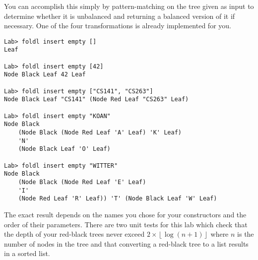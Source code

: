 
You can accomplish this simply by pattern-matching on the tree given as input to determine whether it is unbalanced and returning a balanced version of it if necessary. One of the four transformations is already implemented for you.

\taskLine


\begin{verbatim}
Lab> foldl insert empty []
Leaf

Lab> foldl insert empty [42]
Node Black Leaf 42 Leaf

Lab> foldl insert empty ["CS141", "CS263"]
Node Black Leaf "CS141" (Node Red Leaf "CS263" Leaf)

Lab> foldl insert empty "KOAN"
Node Black 
    (Node Black (Node Red Leaf 'A' Leaf) 'K' Leaf) 
    'N' 
    (Node Black Leaf 'O' Leaf)

Lab> foldl insert empty "WITTER"
Node Black 
    (Node Black (Node Red Leaf 'E' Leaf) 
    'I' 
    (Node Red Leaf 'R' Leaf)) 'T' (Node Black Leaf 'W' Leaf)
\end{verbatim}

The exact result depends on the names you chose for your constructors and the order of their parameters. There are two unit tests for this lab which check that the depth of your red-black trees never exceed $2 \times \left \lfloor{\log(n+1)}\right \rfloor$ where $n$ is the number of nodes in the tree and that converting a red-black tree to a list results in a sorted list. 


\taskLine